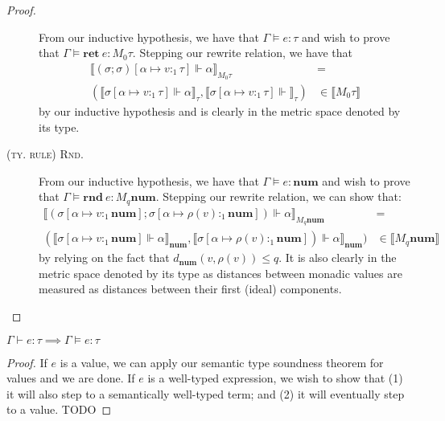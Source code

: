 \begin{proof}
\begin{description}
    From our inductive hypothesis, we have that $\Gamma \vDash e : \tau$ and
    wish to prove that $\Gamma \vDash \mathbf{ret} \ e : M_0 \tau$. Stepping our
    rewrite relation, we have that 
    \begin{equation}
      \begin{aligned}
        \llbracket (\sigma; \sigma)[\alpha \mapsto v:_1 \tau] \Vdash \alpha
        \rrbracket_{M_0 \tau} 
        &= \\
        (\llbracket \sigma[\alpha \mapsto v:_1 \tau] \Vdash \alpha
        \rrbracket_{\tau}, \llbracket \sigma[\alpha
        \mapsto v:_1 \tau] \Vdash \rrbracket_{\tau})
        &\in 
        \llbracket M_0 \tau \rrbracket
      \end{aligned}
    \end{equation}
    by our inductive hypothesis and is clearly  in the metric
    space denoted by its type.
  \item[\textsc{(ty. rule) Rnd.}]
    From our inductive hypothesis, we have that $\Gamma \vDash e : \mathbf{num}$ and
    wish to prove that $\Gamma \vDash \mathbf{rnd} \ e : M_q \mathbf{num}$. Stepping our
    rewrite relation, we can show that:
    \begin{equation}
      \begin{aligned}
        \llbracket (\sigma[\alpha \mapsto v:_1 \mathbf{num}]; \sigma[\alpha \mapsto
        \rho(v) :_1 \mathbf{num}]) \Vdash \alpha \rrbracket_{M_q \mathbf{num}} 
        &= \\
        (\llbracket \sigma[\alpha \mapsto v:_1 \mathbf{num}] \Vdash \alpha
        \rrbracket_{\mathbf{num}}, \llbracket \sigma[\alpha \mapsto \rho(v) :_1
        \mathbf{num}]) \Vdash \alpha \rrbracket_{\mathbf{num}})
        &\in \llbracket M_q \mathbf{num} \rrbracket
      \end{aligned}
    \end{equation}
    by relying on the fact that $d_{\mathbf{num}}(v, \rho(v)) \leq q$. It is
    also clearly  in the metric space denoted by its type as
    distances between monadic values are measured as distances between their
    first (ideal) components.
\end{description}
\end{proof}

\begin{theorem}
$\Gamma \vdash e : \tau \implies \Gamma \vDash e : \tau$
\end{theorem}
\begin{proof}
  If $e$ is a value, we can apply our semantic type soundness theorem for values
  and we are done. If $e$ is a well-typed expression, we wish to show that (1)
  it will also step to a semantically well-typed term; and (2) it will
  eventually step to a value.
  TODO
\end{proof}

